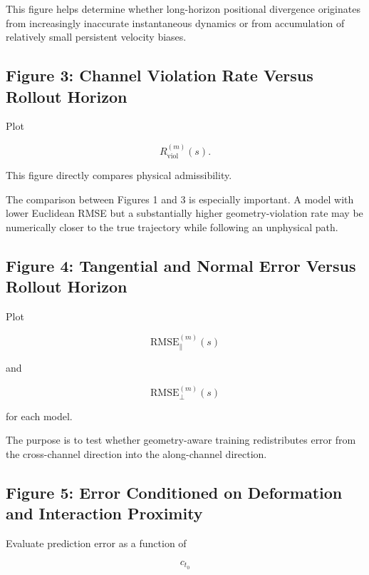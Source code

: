 \documentclass[11pt]{article}
\begin{document}
This figure helps determine whether long-horizon positional divergence originates from increasingly inaccurate instantaneous dynamics or from accumulation of relatively small persistent velocity biases.

\subsection{Figure 3: Channel Violation Rate Versus Rollout Horizon}

Plot

\begin{equation}
R_{\mathrm{viol}}^{(m)}(s).
\end{equation}

This figure directly compares physical admissibility.

The comparison between Figures 1 and 3 is especially important. A model with lower Euclidean RMSE but a substantially higher geometry-violation rate may be numerically closer to the true trajectory while following an unphysical path.

\subsection{Figure 4: Tangential and Normal Error Versus Rollout Horizon}

Plot

\begin{equation}
\mathrm{RMSE}_{\parallel}^{(m)}(s)
\end{equation}

and

\begin{equation}
\mathrm{RMSE}_{\perp}^{(m)}(s)
\end{equation}

for each model.

The purpose is to test whether geometry-aware training redistributes error from the cross-channel direction into the along-channel direction.

\subsection{Figure 5: Error Conditioned on Deformation and Interaction Proximity}

Evaluate prediction error as a function of

\begin{equation}
c_{t_0}
\end{equation}
\end{document}
